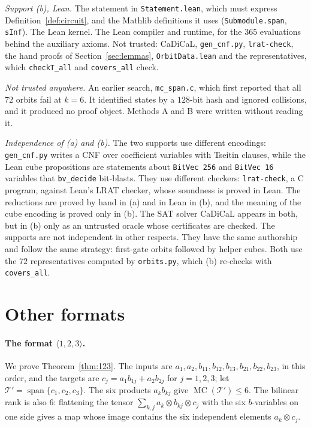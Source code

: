 \documentclass[11pt,a4paper]{article}
\theoremstyle{definition}
\newcommand{\Tg}{\mathcal{T}}
\newcommand{\MC}{\operatorname{MC}}
\newcommand{\spn}{\operatorname{span}}
\newcommand{\code}[1]{\texttt{#1}}
\begin{document}
\emph{Support (b), Lean.} The statement in \code{Statement.lean}, which must express Definition~\ref{def:circuit}, and the Mathlib definitions it uses (\code{Submodule.span}, \code{sInf}). The Lean kernel. The Lean compiler and runtime, for the $365$ evaluations behind the auxiliary axioms. Not trusted: CaDiCaL, \code{gen\_cnf.py}, \code{lrat-check}, the hand proofs of Section~\ref{sec:lemmas}, \code{OrbitData.lean} and the representatives, which \code{checkT\_all} and \code{covers\_all} check.

\emph{Not trusted anywhere.} An earlier search, \code{mc\_span.c}, which first reported that all $72$ orbits fail at $k=6$. It identified states by a $128$-bit hash and ignored collisions, and it produced no proof object. Methods A and B were written without reading it.

\emph{Independence of (a) and (b).} The two supports use different encodings: \code{gen\_cnf.py} writes a CNF over coefficient variables with Tseitin clauses, while the Lean cube propositions are statements about \code{BitVec 256} and \code{BitVec 16} variables that \code{bv\_decide} bit-blasts. They use different checkers: \code{lrat-check}, a C program, against Lean's LRAT checker, whose soundness is proved in Lean. The reductions are proved by hand in (a) and in Lean in (b), and the meaning of the cube encoding is proved only in (b). The SAT solver CaDiCaL appears in both, but in (b) only as an untrusted oracle whose certificates are checked. The supports are not independent in other respects. They have the same authorship and follow the same strategy: first-gate orbits followed by helper cubes. Both use the $72$ representatives computed by \code{orbits.py}, which (b) re-checks with \code{covers\_all}.

\section{Other formats}\label{sec:other}

\paragraph{The format $\langle1,2,3\rangle$.} We prove Theorem~\ref{thm:123}. The inputs are $a_1,a_2,b_{11},b_{12},b_{13},b_{21},b_{22},b_{23}$, in this order, and the targets are $c_j=a_1b_{1j}+a_2b_{2j}$ for $j=1,2,3$; let $\Tg'=\spn\{c_1,c_2,c_3\}$. The six products $a_kb_{kj}$ give $\MC(\Tg')\le6$. The bilinear rank is also $6$: flattening the tensor $\sum_{k,j}a_k\otimes b_{kj}\otimes c_j$ with the six $b$-variables on one side gives a map whose image contains the six independent elements $a_k\otimes c_j$.
\end{document}

